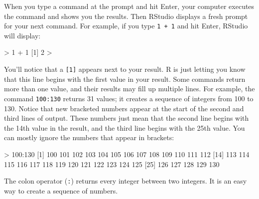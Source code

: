 \documentclass[
  letterpaper,
  DIV=11,
  numbers=noendperiod]{scrbook}
\newenvironment{Shaded}{\begin{snugshade}}{\end{snugshade}}
\newcommand{\DecValTok}[1]{\textcolor[rgb]{0.68,0.00,0.00}{#1}}
\newcommand{\NormalTok}[1]{\textcolor[rgb]{0.00,0.23,0.31}{#1}}
\newcommand{\SpecialCharTok}[1]{\textcolor[rgb]{0.37,0.37,0.37}{#1}}
\begin{document}
When you type a command at the prompt and hit Enter, your computer
executes the command and shows you the results. Then RStudio displays a
fresh prompt for your next command. For example, if you type
\texttt{1\ +\ 1} and hit Enter, RStudio will display:

\begin{Shaded}
\begin{Highlighting}[]
\SpecialCharTok{\textgreater{}} \DecValTok{1} \SpecialCharTok{+} \DecValTok{1}
\NormalTok{[}\DecValTok{1}\NormalTok{] }\DecValTok{2}
\SpecialCharTok{\textgreater{}}
\end{Highlighting}
\end{Shaded}

You'll notice that a \texttt{{[}1{]}} appears next to your result. R is
just letting you know that this line begins with the first value in your
result. Some commands return more than one value, and their results may
fill up multiple lines. For example, the command \texttt{100:130}
returns 31 values; it creates a sequence of integers from 100 to 130.
Notice that new bracketed numbers appear at the start of the second and
third lines of output. These numbers just mean that the second line
begins with the 14th value in the result, and the third line begins with
the 25th value. You can mostly ignore the numbers that appear in
brackets:

\begin{Shaded}
\begin{Highlighting}[]
\SpecialCharTok{\textgreater{}} \DecValTok{100}\SpecialCharTok{:}\DecValTok{130}
\NormalTok{ [}\DecValTok{1}\NormalTok{] }\DecValTok{100} \DecValTok{101} \DecValTok{102} \DecValTok{103} \DecValTok{104} \DecValTok{105} \DecValTok{106} \DecValTok{107} \DecValTok{108} \DecValTok{109} \DecValTok{110} \DecValTok{111} \DecValTok{112}
\NormalTok{[}\DecValTok{14}\NormalTok{] }\DecValTok{113} \DecValTok{114} \DecValTok{115} \DecValTok{116} \DecValTok{117} \DecValTok{118} \DecValTok{119} \DecValTok{120} \DecValTok{121} \DecValTok{122} \DecValTok{123} \DecValTok{124} \DecValTok{125}
\NormalTok{[}\DecValTok{25}\NormalTok{] }\DecValTok{126} \DecValTok{127} \DecValTok{128} \DecValTok{129} \DecValTok{130}
\end{Highlighting}
\end{Shaded}

\begin{tcolorbox}[enhanced jigsaw, breakable, colback=white, colbacktitle=quarto-callout-tip-color!10!white, arc=.35mm, bottomrule=.15mm, coltitle=black, left=2mm, rightrule=.15mm, colframe=quarto-callout-tip-color-frame, leftrule=.75mm, opacitybacktitle=0.6, bottomtitle=1mm, toptitle=1mm, titlerule=0mm, opacityback=0, title=\textcolor{quarto-callout-tip-color}{\faLightbulb}\hspace{0.5em}{Tip}, toprule=.15mm]

The colon operator (\texttt{:}) returns every integer between two
integers. It is an easy way to create a sequence of numbers.

\end{tcolorbox}
\end{document}
